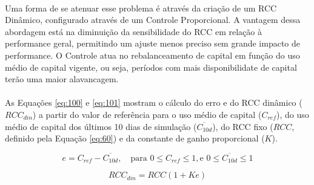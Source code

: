 \paragraph{} Uma forma de se atenuar esse problema é através da criação de um RCC Dinâmico, configurado através de um Controle Proporcional. A vantagem dessa abordagem está na diminuição da sensibilidade do RCC em relação à performance geral, permitindo um ajuste menos preciso sem grande impacto de performance. O Controle atua no rebalanceamento de capital em função do uso médio de capital vigente, ou seja, períodos com mais disponibilidate de capital terão uma maior alavancagem.

\paragraph{} As Equações \ref{eq:100} e \ref{eq:101} mostram o cálculo do erro e do RCC dinâmico (\begin{math} RCC_{din} \end{math}) a partir do valor de referência para o uso médio de capital (\begin{math} C_{ref} \end{math}), do uso médio de capital dos últimos 10 dias de simulação (\begin{math} \overline{C_{10d}} \end{math}), do RCC fixo (\begin{math} RCC \end{math}, definido pela Equação \ref{eq:60}) e da constante de ganho proporcional (\begin{math} K \end{math}).

\begin{equation} \label{eq:100}
    e = C_{ref} - \overline{C_{10d}}, \quad \mbox{para } 0 \le C_{ref}\le 1, \mbox{e } 0 \le \overline{C_{10d}} \le 1
\end{equation}

\begin{equation} \label{eq:101}
    RCC_{din} = RCC (1 + K e)
\end{equation}


